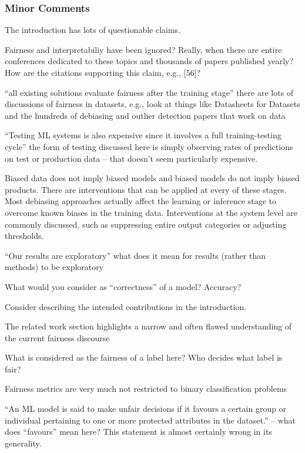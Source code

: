\documentclass[conference,review,anonymous]{IEEEtran}
\begin{document}
\subsubsection{Minor Comments}
\begin{IEEEitemize}
  \item The introduction has lots of questionable claims.
  \item Fairness and interpretabiliy have been ignored? Really, when there are entire conferences dedicated to these topics and thousands of papers published yearly? How are the citations supporting this claim, e.g., [56]?
  \item ``all existing solutions evaluate fairness after the training stage'' there are lots of discussions of fairness in datasets, e.g., look at things like Datasheets for Datasets and the hundreds of debiasing and outlier detection papers that work on data
  \item ``Testing ML systems is also expensive since it involves a full training-testing cycle'' the form of testing discussed here is simply observing rates of predictions on test or production data -- that doesn’t seem particularly expensive.
  \item Biased data does not imply biased models and biased models do not imply biased products. There are interventions that can be applied at every of these stages. Most debiasing approaches actually affect the learning or inference stage to overcome known biases in the training data. Interventions at the system level are commonly discussed, such as suppressing entire output categories or adjusting thresholds.
  \item ``Our results are exploratory'' what does it mean for results (rather than methods) to be exploratory
  \item What would you consider as ``correctness'' of a model? Accuracy?
  \item Consider describing the intended contributions in the introduction.
  \item The related work section highlights a narrow and often flawed understanding of the current fairness discourse
  \item What is considered as the fairness of a label here? Who decides what label is fair?
  \item Fairness metrics are very much not restricted to binary classification problems
  \item ``An ML model is said to make unfair decisions if it favours a certain group or individual pertaining to one or more protected attributes in the dataset.'' -- what does ``favours'' mean here? This statement is almost certainly wrong in its generality.

\end{IEEEitemize}
\end{document}
